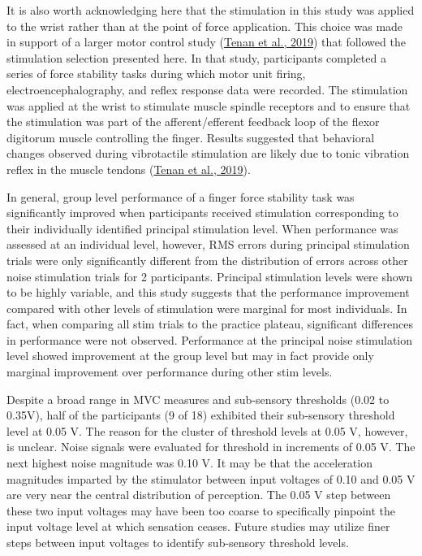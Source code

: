 \documentclass[]{cik}%
\begin{document}
It is also worth acknowledging here that the stimulation in this study
was applied to the wrist rather than at the point of force application.
This choice was made in support of a larger motor control study
(\protect\hyperlink{ref-Tenan2019}{Tenan et al., 2019}) that followed
the stimulation selection presented here. In that study, participants
completed a series of force stability tasks during which motor unit
firing, electroencephalography, and reflex response data were recorded.
The stimulation was applied at the wrist to stimulate muscle spindle
receptors and to ensure that the stimulation was part of the
afferent/efferent feedback loop of the flexor digitorum muscle
controlling the finger. Results suggested that behavioral changes
observed during vibrotactile stimulation are likely due to tonic
vibration reflex in the muscle tendons
(\protect\hyperlink{ref-Tenan2019}{Tenan et al., 2019}).

In general, group level performance of a finger force stability task was
significantly improved when participants received stimulation
corresponding to their individually identified principal stimulation
level. When performance was assessed at an individual level, however,
RMS errors during principal stimulation trials were only significantly
different from the distribution of errors across other noise stimulation
trials for 2 participants. Principal stimulation levels were shown to be
highly variable, and this study suggests that the performance
improvement compared with other levels of stimulation were marginal for
most individuals. In fact, when comparing all stim trials to the
practice plateau, significant differences in performance were not
observed. Performance at the principal noise stimulation level showed
improvement at the group level but may in fact provide only marginal
improvement over performance during other stim levels.

Despite a broad range in MVC measures and sub-sensory thresholds (0.02
to 0.35V), half of the participants (9 of 18) exhibited their
sub-sensory threshold level at 0.05 V. The reason for the cluster of
threshold levels at 0.05 V, however, is unclear. Noise signals were
evaluated for threshold in increments of 0.05 V. The next highest noise
magnitude was 0.10 V. It may be that the acceleration magnitudes
imparted by the stimulator between input voltages of 0.10 and 0.05 V are
very near the central distribution of perception. The 0.05 V step
between these two input voltages may have been too coarse to
specifically pinpoint the input voltage level at which sensation ceases.
Future studies may utilize finer steps between input voltages to
identify sub-sensory threshold levels.
\end{document}
